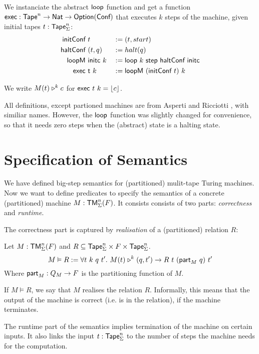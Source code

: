 We instanciate the abstract $\textsf{loop}$ function and get a function $\textsf{exec} : \textsf{Tape}^n \rightarrow \textsf{Nat} \rightarrow \textsf{Option}(\textsf{Conf})$ that executes $k$ steps
of the machine, given initial tapes $t: \textsf{Tape}_\Sigma^n$:
\begin{alignat*}{3}
  \textsf{initConf}   &~t               &&:= (t, start) \\
  \textsf{haltConf}   &~(t, q)          &&:= halt(q) \\
  \textsf{loopM}      &~\textsf{initc}~k    &&:= \textsf{loop}~k~\textsf{step}~\textsf{haltConf}~\textsf{initc} \\
  \textsf{exec}       &~\textsf{t}~k        &&:= \textsf{loopM}~(\textsf{initConf}~t)~k
\end{alignat*}

We write $M(t) \mathrel{\triangleright}^k c$ for $\textsf{exec}~t~k = \left\lfloor {c}\right\rfloor$.

All definitions, except partioned machines are from Asperti and Ricciotti \cite{asperti2015}, with similiar names.  However, the $\textsf{loop}$ function
was slightly changed for convenience, so that it needs zero steps when the (abstract) state is a halting state.

\section{Specification of Semantics}
\label{sec:spec_semantics}

We have defined big-step semantics for (partitioned) mulit-tape Turing machines.  Now we want to define predicates to specify the semantics of a
concrete (partitioned) machine $M: \textsf{TM}_\Sigma^n(F)$.  It consists consists of two parts: \emph{correctness} and \emph{runtime}.

The correctness part is captured by \emph{realisation} of a (partitioned) relation $R$:

\begin{definition}[Realisation]
  \label{def:realisation}
  Let $M:\textsf{TM}_\Sigma^n(F)$ and $R \subseteq \textsf{Tape}_\Sigma^n \times F \times \textsf{Tape}_\Sigma^n$.
  \[
    M \vDash R :=
    \forall t~k~q~t'.~M(t) \mathrel{\triangleright}^k (q, t') \rightarrow
    R~t~(\textsf{part}_M~q)~t'
  \]
  Where $\textsf{part}_M : Q_M \rightarrow F$ is the partitioning function of $M$.
\end{definition}

If $M \vDash R$, we say that $M$ realises the relation $R$.  Informally, this means that the output of the machine is correct (i.e. is in the
relation), if the machine terminates.

The runtime part of the semantics implies termination of the machine on certain inputs.  It also links the input $t:\textsf{Tape}_\Sigma^n$ to the number of
steps the machine needs for the computation.

